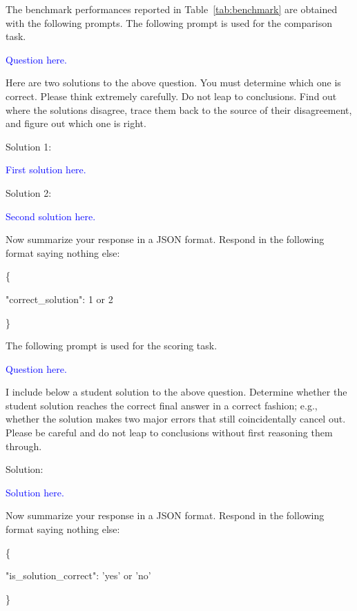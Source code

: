 The benchmark performances reported in Table~\ref{tab:benchmark} are obtained with the following prompts.
The following prompt is used for the comparison task.
\begin{tcolorbox}[title=Comparison Task Prompt Part 1]
\textcolor{blue}{Question here.}

  Here are two solutions to the above question. You must determine which one is correct. Please think extremely carefully. Do not leap to conclusions. Find out where the solutions disagree, trace them back to the source of their disagreement, and figure out which one is right.

  Solution 1:
  
\textcolor{blue}{First solution here.}

  Solution 2:
  
\textcolor{blue}{Second solution here.}
\end{tcolorbox}
\begin{tcolorbox}[title=Comparison Task Prompt Part 2]
Now summarize your response in a JSON format. Respond in the following format saying nothing else:

  \{
  
     "correct\_solution": 1 or 2
     
  \}
\end{tcolorbox}

The following prompt is used for the scoring task.
\begin{tcolorbox}[title=Scoring Task Prompt Part 1]
\textcolor{blue}{Question here.}

 I include below a student solution to the above question. Determine whether the student solution reaches the correct final answer in a correct fashion; e.g., whether the solution makes two major errors that still coincidentally cancel out. Please be careful and do not leap to conclusions without first reasoning them through.

Solution:

\textcolor{blue}{Solution here.}
\end{tcolorbox}
\begin{tcolorbox}[title=Scoring Task Prompt Part 2]
Now summarize your response in a JSON format. Respond in the following format saying nothing else:

\{
 
 "is\_solution\_correct": 'yes' or 'no'

\}
\end{tcolorbox}
